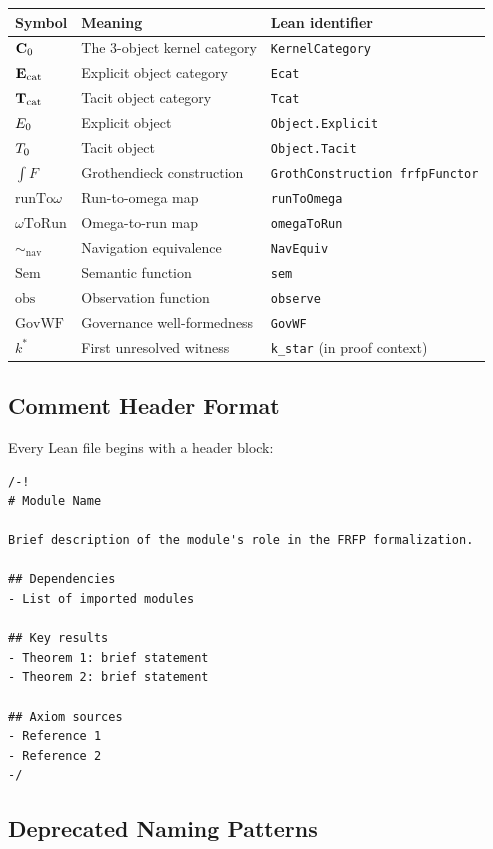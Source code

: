 \begin{center}
\begin{tabular}{lll}
\toprule
Symbol & Meaning & Lean identifier \\
\midrule
$\mathbf{C}_0$ & The 3-object kernel category & \texttt{KernelCategory} \\
$\mathbf{E}_{\mathrm{cat}}$ & Explicit object category & \texttt{Ecat} \\
$\mathbf{T}_{\mathrm{cat}}$ & Tacit object category & \texttt{Tcat} \\
$E_0$ & Explicit object & \texttt{Object.Explicit} \\
$T_0$ & Tacit object & \texttt{Object.Tacit} \\
$\int F$ & Grothendieck construction & \texttt{GrothConstruction frfpFunctor} \\
$\mathrm{runTo}\omega$ & Run-to-omega map & \texttt{runToOmega} \\
$\omega\mathrm{ToRun}$ & Omega-to-run map & \texttt{omegaToRun} \\
$\sim_\mathrm{nav}$ & Navigation equivalence & \texttt{NavEquiv} \\
$\mathrm{Sem}$ & Semantic function & \texttt{sem} \\
$\mathrm{obs}$ & Observation function & \texttt{observe} \\
$\mathrm{GovWF}$ & Governance well-formedness & \texttt{GovWF} \\
$k^*$ & First unresolved witness & \texttt{k\_star} (in proof context) \\
\bottomrule
\end{tabular}
\end{center}

\subsection*{Comment Header Format}

Every Lean file begins with a header block:

\begin{lstlisting}
/-!
# Module Name

Brief description of the module's role in the FRFP formalization.

## Dependencies
- List of imported modules

## Key results
- Theorem 1: brief statement
- Theorem 2: brief statement

## Axiom sources
- Reference 1
- Reference 2
-/
\end{lstlisting}

\subsection*{Deprecated Naming Patterns}

